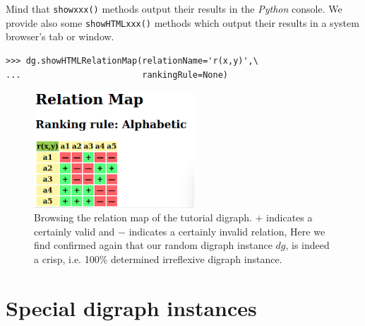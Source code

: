 Mind that \texttt{showxxx()} methods output their results in the \emph{Python} console. We provide also some \texttt{showHTMLxxx()} methods which output their results in a system browser’s tab or window.
\begin{lstlisting}[label=list:1.7,basicstyle=\footnotesize]
>>> dg.showHTMLRelationMap(relationName='r(x,y)',\
...                        rankingRule=None)
\end{lstlisting}
\begin{figure}[h]
\sidecaption[t]
\includegraphics[width=6cm]{Figures/relationMap1.png}
\caption{Browsing the relation map of the tutorial digraph. $+$ indicates a certainly valid and $-$ indicates a certainly  invalid relation, Here we find confirmed again that our random digraph instance $dg$, is indeed a crisp, i.e. 100\% determined irreflexive digraph instance.}
\label{fig:1.2}       %
\end{figure}

\section{Special digraph instances}
\label{sec:1.5}

